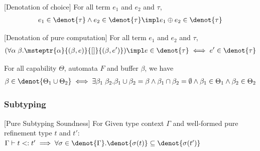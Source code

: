 \begin{lemma}\label{lemma:choice-denot}[Denotation of choice] For all term $e_1$ and $e_2$ and \PAT $\tau$,
{\small\begin{align*}
    e_1 \in \denot{\tau} \land e_2 \in \denot{\tau} \impl e_1 \oplus e_2 \in \denot{\tau}
\end{align*}}
\end{lemma}

\begin{lemma}\label{lemma:pure-denot}[Denotation of pure computation] For all term $e_1$ and $e_2$ and \PAT $\tau$,
{\small\begin{align*}
    (\forall \alpha\;\beta. \msteptr{\alpha}{(\beta, e)}{[]}{(\beta, e')}) \impl
   e\in \denot{\tau} \iff e' \in \denot{\tau}
\end{align*}}
\end{lemma}

\begin{lemma}\label{lemma:buf-partition} For all capability $\Theta$, automata $F$ and buffer $\beta$, we have
\begin{align*}
    \beta \in \denot{\Theta_1 \cup \Theta_2} \iff
    \exists \beta_1\;\beta_2. \beta_1 \cup \beta_2 = \beta \land \beta_1 \cap \beta_2 = \emptyset \land \beta_1 \in \Theta_1 \land \beta_2 \in \Theta_2
\end{align*}
\end{lemma}



\subsubsection{Subtyping}

\begin{lemma}\label{lemma:pure-subtyping}[Pure Subtyping Soundness] For Given type context $\Gamma$ and well-formed pure refinement type $t$ and $t'$:
  $\Gamma \vdash t <: t' \implies \forall \sigma \in \denot{\Gamma}. \denot{\sigma(t)} \subseteq \denot{\sigma(t')}$
\end{lemma}

